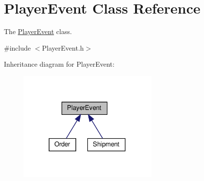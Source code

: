 \hypertarget{classPlayerEvent}{}\section{Player\+Event Class Reference}
\label{classPlayerEvent}


The \hyperlink{classPlayerEvent}{Player\+Event} class.  




{\ttfamily \#include $<$Player\+Event.\+h$>$}



Inheritance diagram for Player\+Event\+:\nopagebreak
\begin{figure}[H]
\begin{center}
\leavevmode
\includegraphics[width=198pt]{classPlayerEvent__inherit__graph}
\end{center}
\end{figure}
